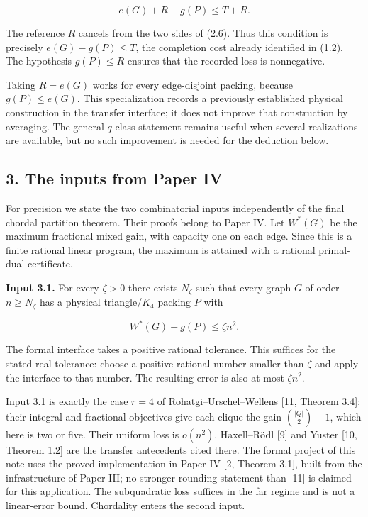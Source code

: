 \documentclass[english,11pt,a4paper]{article}
\begin{document}
\[
e(G)+R-g(P)\le T+R.
\tag{2.6}
\]

The reference \(R\) cancels from the two sides of (2.6). Thus this
condition is precisely \(e(G)-g(P)\le T\), the completion cost already
identified in (1.2). The hypothesis \(g(P)\le R\) ensures that the
recorded loss is nonnegative.

Taking \(R=e(G)\) works for every edge-disjoint packing, because
\(g(P)\le e(G)\). This specialization records a previously established
physical construction in the transfer interface; it does not improve
that construction by averaging. The general \(q\)-class statement
remains useful when several realizations are available, but no such
improvement is needed for the deduction below.

\subsection{3. The inputs from Paper IV}\label{the-inputs-from-paper-iv}

For precision we state the two combinatorial inputs independently of the
final chordal partition theorem. Their proofs belong to Paper IV. Let
\(W^*(G)\) be the maximum fractional mixed gain, with capacity one on
each edge. Since this is a finite rational linear program, the maximum
is attained with a rational primal-dual certificate.

\textbf{Input 3.1.} For every \(\zeta>0\) there exists \(N_\zeta\) such
that every graph \(G\) of order \(n\ge N_\zeta\) has a physical
triangle/\(K_4\) packing \(P\) with

\[
W^*(G)-g(P)\le\zeta n^2.
\tag{3.1}
\]

The formal interface takes a positive rational tolerance. This suffices
for the stated real tolerance: choose a positive rational number smaller
than \(\zeta\) and apply the interface to that number. The resulting
error is also at most \(\zeta n^2\).

Input 3.1 is exactly the case \(r=4\) of Rohatgi--Urschel--Wellens
{[}11, Theorem 3.4{]}: their integral and fractional objectives give
each clique the gain \(\binom{|Q|}{2}-1\), which here is two or five.
Their uniform loss is \(o(n^2)\). Haxell--Rödl {[}9{]} and Yuster {[}10,
Theorem 1.2{]} are the transfer antecedents cited there. The formal
project of this note uses the proved implementation in Paper IV {[}2,
Theorem 3.1{]}, built from the infrastructure of Paper III; no stronger
rounding statement than {[}11{]} is claimed for this application. The
subquadratic loss suffices in the far regime and is not a linear-error
bound. Chordality enters the second input.
\end{document}
